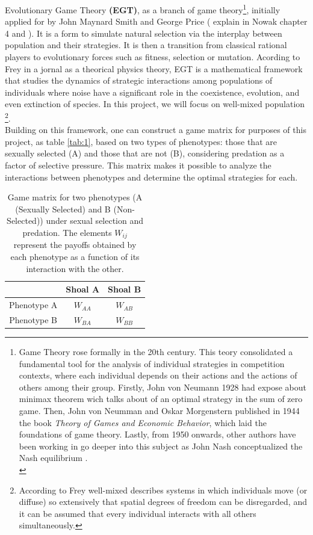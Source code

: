 Evolutionary Game Theory \textbf{(EGT)}, as a branch of game theory\footnote{
Game Theory rose formally in the 20th century. This teory consolidated a fundamental tool  for the analysis of individual strategies in competition contexts, where each individual depends on their actions and the actions of others among their group. Firstly, John von Neumann 1928 had expose about minimax theorem wich talks about of an optimal strategy in the sum of zero game. Then, John von Neumman and Oskar Morgenstern  published in 1944 the book \textit{Theory of Games and Economic Behavior}, which laid the foundations of game theory. Lastly, from 1950 onwards, other authors have been working  in go deeper into this subject as John Nash conceptualized the Nash equilibrium \cite{vonneumann1944, GameTheoryVery, nasar1998}.\\ 
}, initially applied for by John Maynard Smith and George Price  (\cite{maynardsmith1973, maynardsmith1982} explain in Nowak chapter 4  \cite{nowakEvolutionaryDynamicsExploring2006} and \cite{freyEvolutionaryGameTheory2010}). It is a form to simulate natural selection via the interplay between population and their strategies.
It is then a transition from classical rational players to evolutionary forces such as fitness, selection or
mutation. Acording to Frey \cite{freyEvolutionaryGameTheory2010} in a 
jornal as a theorical physics theory, EGT is a mathematical framework that studies the dynamics of
strategic interactions among populations of individuals where  noise have a significant role in the coexistence, evolution, and even extinction of species. In this project, we will focus on well-mixed population \footnote{According to Frey \cite{freyEvolutionaryGameTheory2010} well-mixed describes systems in which individuals move (or diffuse) so extensively that spatial degrees of freedom can be disregarded, and it can be assumed that every individual interacts with all others simultaneously. }.\\

Building on this framework, one can construct a game matrix for purposes of this project, as table \ref{tab:1}, based on two types of phenotypes: those that are sexually selected (A) and those that are not (B), considering predation as a factor of selective pressure. This matrix makes it possible to analyze the interactions between phenotypes and determine the optimal strategies for each. \\ 

\begin{table}[!h]
    \centering
    \begin{tabular}{c|cc}
        & Shoal A& Shoal B\\
        \hline
        Phenotype A & $W_{AA}$ & $W_{AB}$ \\
        Phenotype B & $W_{BA}$ & $W_{BB}$ \\
    \end{tabular}
    \caption{Game matrix for two phenotypes (A (Sexually Selected) and B (Non-Selected)) under sexual selection and predation. The elements $W_{ij}$  represent the payoffs obtained by each phenotype as a function of its interaction with the other.}
    \label{tab:payoffMatrix}
\end{table}



